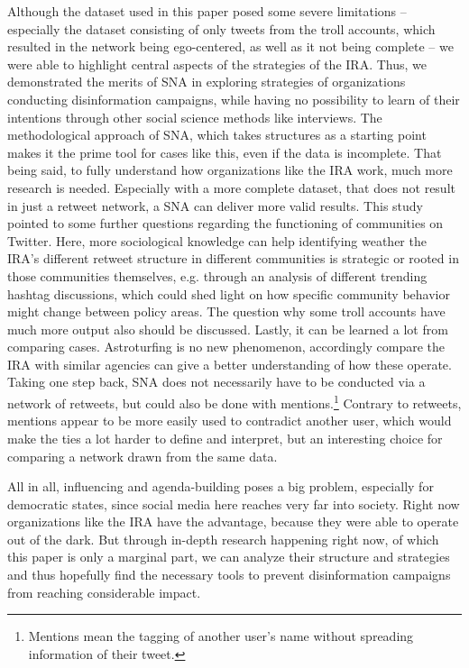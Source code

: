\documentclass[12pt, titlepage=true, toc=bib]{scrartcl}
\begin{document}
Although the dataset used in this paper posed some severe limitations -- especially the dataset consisting of only tweets from the troll accounts, which resulted in the network being ego-centered, as well as it not being complete -- we were able to highlight central aspects of the strategies of the IRA. Thus, we demonstrated the merits of SNA in exploring strategies of organizations conducting disinformation campaigns, while having no possibility to learn of their intentions through other social science methods like interviews. The methodological approach of SNA, which takes structures as a starting point makes it the prime tool for cases like this, even if the data is incomplete. That being said, to fully understand how organizations like the IRA work, much more research is needed. Especially with a more complete dataset, that does not result in just a retweet network, a SNA can deliver more valid results. This study pointed to some further questions regarding the functioning of communities on Twitter. Here, more sociological knowledge can help identifying weather the IRA's different retweet structure in different communities is strategic or rooted in those communities themselves, e.g. through an analysis of different trending hashtag discussions, which could shed light on how specific community behavior might change between policy areas. The question why some troll accounts have much more output also should be discussed. Lastly, it can be learned a lot from comparing cases. Astroturfing is no new phenomenon, accordingly compare the IRA with similar agencies can give a better understanding of how these operate. Taking one step back, SNA does not necessarily have to be conducted via a network of retweets, but could also be done with mentions.\footnote{Mentions mean the tagging of another user's name without spreading information of their tweet.} Contrary to retweets, mentions appear to be more easily used to contradict another user, which would make the ties a lot harder to define and interpret, but an interesting choice for comparing a network drawn from the same data.

All in all, influencing and agenda-building poses a big problem, especially for democratic states, since social media here reaches very far into society. Right now organizations like the IRA have the advantage, because they were able to operate out of the dark. But through in-depth research happening right now, of which this paper is only a marginal part, we can analyze their structure and strategies and thus hopefully find the necessary tools to prevent disinformation campaigns from reaching considerable impact.


\newpage

\printbibliography
\end{document}
